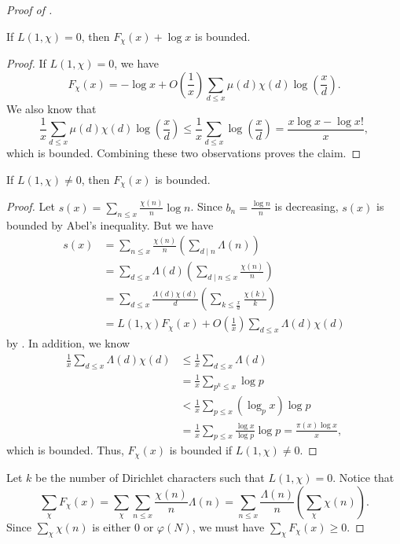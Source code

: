 \documentclass{scrartcl}
\begin{document}
\begin{proof}[Proof of ]
	\begin{claim}
		If $L(1, \chi)=0$, then $F_\chi(x)+\log x$ is bounded. 
	\end{claim}
	
	\begin{proof}
		If $L(1, \chi)=0$, we have
		$$F_\chi(x) = -\log x+O\left(\frac{1}{x}\right) \sum_{d\le x}\mu(d)\chi(d)\log \left(\frac{x}{d}\right).$$
		We also know that 
		$$\frac{1}{x}\sum_{d\le x}\mu(d)\chi(d)\log \left(\frac{x}{d}\right) \le 
		\frac{1}{x} \sum_{d\le x}\log \left(\frac{x}{d}\right) = \frac{x\log x-\log x!}{x},$$
		which is bounded. Combining these two observations proves the claim. 
	\end{proof}
	
	\begin{claim}
		If $L(1, \chi)\neq 0$, then $F_\chi(x)$ is bounded. 
	\end{claim}
	
	\begin{proof}
		Let $s(x)=\sum_{n\le x}\frac{\chi(n)}{n}\log n$. Since $b_n=\frac{\log n}{n}$ is decreasing, 
		$s(x)$ is bounded by Abel's inequality. 
		But we have 
		\begin{align*}
			s(x)&=\sum_{n\le x}\frac{\chi(n)}{n}\left(\sum_{d\mid n}\Lambda(n)\right) \\
			&= \sum_{d\le x} \Lambda(d)\left(\sum_{d\mid n\le x} \frac{\chi(n)}{n}\right) \\
			&= \sum_{d\le x} \frac{\Lambda(d)\chi(d)}{d}\left(\sum_{k\le \frac{x}{d}} \frac{\chi(k)}{k}\right) \\
			&= L(1, \chi)F_\chi(x)+O\left(\frac{1}{x}\right)\sum_{d\le x}\Lambda(d)\chi(d)
		\end{align*}
		by . In addition, we know 
		\begin{align*}
			\frac{1}{x}\sum_{d\le x} \Lambda(d)\chi(d) &\le \frac{1}{x}\sum_{d\le x}\Lambda(d) \\
			&=\frac{1}{x}\sum_{p^k\le x}\log p \\
			&< \frac{1}{x}\sum_{p\le x}(\log_p x)\log p \\
			&= \frac{1}{x}\sum_{p\le x}\frac{\log x}{\log p}\log p = \frac{\pi(x)\log x}{x},
		\end{align*}
		which is bounded. Thus, $F_\chi(x)$ is bounded if $L(1, \chi)\neq 0$. 
	\end{proof}
	
	Let $k$ be the number of Dirichlet characters such that $L(1, \chi)=0$. 
	Notice that  
	$$\sum_{\chi} F_\chi(x) = \sum_\chi \sum_{n\le x} \frac{\chi(n)}{n}\Lambda(n) = 
	\sum_{n\le x}\frac{\Lambda(n)}{n}\left(\sum_\chi \chi(n)\right).$$
	Since $\sum_\chi \chi(n)$ is either $0$ or $\varphi(N)$, we must have 
	$\sum_{\chi} F_\chi(x)\ge 0$. 
	

\end{proof}
\end{document}
